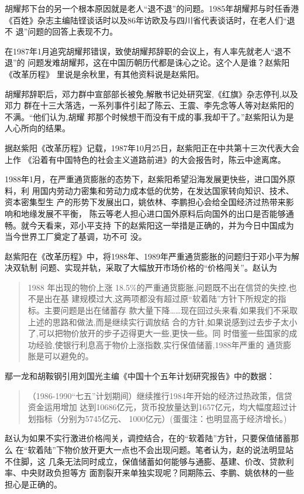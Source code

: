 胡耀邦下台的另一个根本原因就是老人“退不退”的问题。1985年胡耀邦与时任香港
《百姓》杂志主编陆铿谈话时以及86年访欧及与四川省代表谈话时，在老人们“退不
退”问题的回答上表现不力。

在1987年1月追究胡耀邦错误，致使胡耀邦辞职的会议上，有人率先就老人“退不退”的
问题发难胡耀邦，这在中国历朝历代都是诛心之论。这个人是谁？赵紫阳《改革历程》
里说是余秋里，有其他资料说是赵紫阳。

胡耀邦辞职后，邓力群中宣部部长被免,解散书记处研究室,《红旗》杂志停刊,以及邓力
群在十三大落选，一系列事件引起了陈云、王震、李先念等人等对赵紫阳的不满。“他们认为,胡耀
邦那个时候想干而没有干成的事,我却干了。”赵紫阳认为是人心所向的结果。

据赵紫阳《改革历程》记载，1987年10月25日，赵紫阳正在中共第十三次代表大会上作
《沿着有中国特色的社会主义道路前进》的大会报告时，陈云中途离席。

1988年1月，在严重通货膨胀的态势下，赵紫阳希望沿海发展更快些，进口国外原料，利
用国内劳动力密集和劳动力成本低的优势，在发达国家转向知识、技术、资本密集型生
产的形势下发展出口，姚依林、李鹏担心会给全国经济过热带来影响和地缘发展不平衡，
陈云等老人担心进口国外原料后向国外的出口是否能够通畅。就今天看来，邓小平支持
下的赵紫阳这一举措是正确的，并为今日中国成为当今世界工厂奠定了基调，功不可
没。

赵紫阳在《改革历程》中，将1988年、1989年严重通货膨胀的问题归于邓小平为解决双轨制
问题、实现并轨，采取了大幅放开市场价格的“价格闯关”。赵认为
\begin{quotation}
  1988 年出现的物价上涨 18.5\%的严重通货膨胀,问题既不出在信贷的失控,也不是出在基
  建规模过大,这两项都没有超过原“软着陆”方针下所规定的指标。主要问题是出在储蓄存
  款大量下降……现在回过头来看,如果我们不采取上述的思路和做法,而是继续实行调放结
  合的方针,如果说感到过去步子太小了,可以把物价放开的步子迈得更大一些,更快一些。同
  时借鉴一些国家的成功经验,使银行利息高于物价上涨指数,实行保值储蓄,1988年严重的
  通货膨胀是可以避免的。
\end{quotation}

鄢一龙和胡鞍钢引用刘国光主编《中国十个五年计划研究报告》中的数据：
\begin{quotation}
（1986-1990“七五”计划期间）继续推行1984年开始的经济过热政策，信贷资金运用增加
达到10686亿元，货币投放量达到1657亿元，均大幅度超过计划指标（分别为5745亿元、
1000亿元）(蛋蛋注：也明显高于经济增长。)\cite{shiyiwu}
\end{quotation}

赵认为如果不实行激进价格闯关，调控结合，在的“软着陆”方针，只要保值储蓄那么
在“软着陆”下物价放开更大一点也不会出现问题。笔者认为，赵的说法明显站不住脚，这
几条无法同时成立，保值储蓄如何能够与通膨、基建、价改、贷款利率、中央财政负担等方
面割裂开来单独实现呢？同期陈云、李鹏、姚依林的一些担心是正确的。

